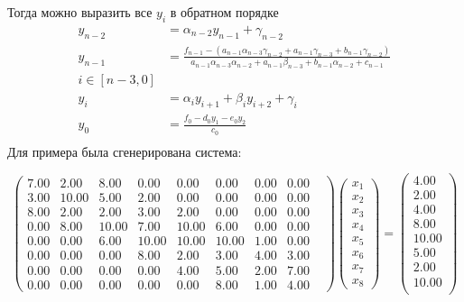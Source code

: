 \documentclass[a4paper, fontsize=14pt]{article}
\begin{document}
Тогда можно выразить все $y_i$ в обратном порядке
\begin{equation*}
    \begin{aligned}
        y_{n-2}&=\alpha_{n-2}y_{n-1}+\gamma_{n-2}\\
        y_{n-1}&=\frac{f_{n-1}-(a_{n-1}\alpha_{n-3}\gamma_{n-2}+a_{n-1}\gamma_{n-3}+b_{n-1}\gamma_{n-2})}{a_{n-1}\alpha_{n-3}\alpha_{n-2}+a_{n-1}\beta_{n-3}+b_{n-1}\alpha_{n-2}+c_{n-1}}\\
        i\in[n-3,0]\\
        y_i&=\alpha_iy_{i+1}+\beta_iy_{i+2}+\gamma_i\\
        y_0 &=\frac{f_0-d_0y_1-e_0y_2}{c_0} \\
    \end{aligned}
\end{equation*}
\newpage
Для примера была сгенерирована система:

\begin{equation}
    \label{eq:pentadiagonal}
    \begin{pmatrix}
        7.00& 2.00& 8.00& 0.00& 0.00& 0.00& 0.00& 0.00&\\
        3.00&10.00& 5.00& 2.00& 0.00& 0.00& 0.00& 0.00&\\
        8.00& 2.00& 2.00& 3.00& 2.00& 0.00& 0.00& 0.00&\\
        0.00& 8.00&10.00& 7.00&10.00& 6.00& 0.00& 0.00&\\
        0.00& 0.00& 6.00&10.00&10.00&10.00& 1.00& 0.00&\\
        0.00& 0.00& 0.00& 8.00& 2.00& 3.00& 4.00& 3.00&\\
        0.00& 0.00& 0.00& 0.00& 4.00& 5.00& 2.00& 7.00&\\
        0.00& 0.00& 0.00& 0.00& 0.00& 8.00& 1.00& 4.00&
    \end{pmatrix}
    \begin{pmatrix}
       x_1\\x_2\\x_3\\x_4\\x_5\\x_6\\x_7\\x_8
    \end{pmatrix}
    =
    \begin{pmatrix}
        4.00\\  2.00\\  4.00\\  8.00\\ 10.00\\  5.00\\  2.00\\ 10.00\\
    \end{pmatrix}
\end{equation}
\end{document}
